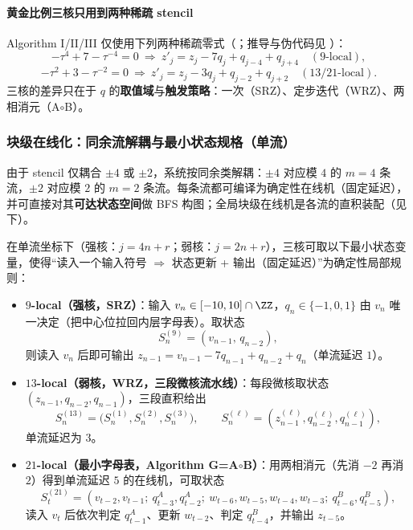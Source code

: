 \paragraph{黄金比例三核只用到两种稀疏 stencil}
Algorithm I/II/III 仅使用下列两种稀疏零式（\cite{SvobodovaAAMPVIIIParallelAddition}；推导与伪代码见 \cite{FrougnyHellerPelantovaSvobodovaParallelAlgorithmsSlides}）：
\[
-\tau^4+7-\tau^{-4}=0\ \Rightarrow\ z'_j=z_j-7q_j+q_{j-4}+q_{j+4}\quad (9\text{-local}),
\]
\[
-\tau^2+3-\tau^{-2}=0\ \Rightarrow\ z'_j=z_j-3q_j+q_{j-2}+q_{j+2}\quad (13/21\text{-local}).
\]
三核的差异只在于 $q$ 的\textbf{取值域}与\textbf{触发策略}：一次（SRZ）、定步迭代（WRZ）、两相消元（A$\circ$B）。

\subsubsection{块级在线化：同余流解耦与最小状态规格（单流）}
由于 stencil 仅耦合 $\pm 4$ 或 $\pm 2$，系统按同余类解耦：$\pm 4$ 对应模 $4$ 的 $m=4$ 条流，$\pm 2$ 对应模 $2$ 的 $m=2$ 条流。每条流都可编译为确定性在线机（固定延迟），并可直接对其\textbf{可达状态空间}做 BFS 构图；全局块级在线机是各流的直积装配（见下）。

\begin{proposition}\label{prop:min-state-spec-flow}
在单流坐标下（强核：$j=4n+r$；弱核：$j=2n+r$），三核可取以下最小状态变量，使得“读入一个输入符号 $\Rightarrow$ 状态更新 + 输出（固定延迟）”为确定性局部规则：
\begin{itemize}
  \item \textbf{$9$-local（强核，SRZ）}：输入 $v_n\in[-10,10]\cap\ZZ$，$q_n\in\{-1,0,1\}$ 由 $v_n$ 唯一决定（把中心位拉回内层字母表）。取状态
  \[
  S^{(9)}_n=(v_{n-1},\,q_{n-2}),
  \]
  则读入 $v_n$ 后即可输出 $z_{n-1}=v_{n-1}-7q_{n-1}+q_{n-2}+q_n$（单流延迟 $1$）。
  \item \textbf{$13$-local（弱核，WRZ，三段微核流水线）}：每段微核取状态
  \(
  (z_{n-1},q_{n-2},q_{n-1})
  \)，三段直积给出
  \[
  S^{(13)}_n=\bigl(S^{(1)}_n,S^{(2)}_n,S^{(3)}_n\bigr),
  \qquad S^{(\ell)}_n=(z^{(\ell)}_{n-1},q^{(\ell)}_{n-2},q^{(\ell)}_{n-1}),
  \]
  单流延迟为 $3$。
  \item \textbf{$21$-local（最小字母表，Algorithm G=A$\circ$B）}：用两相消元（先消 $-2$ 再消 $2$）得到单流延迟 $5$ 的在线机，可取状态
  \[
  S^{(21)}_t=(v_{t-2},v_{t-1};\ q^A_{t-3},q^A_{t-2};\ w_{t-6},w_{t-5},w_{t-4},w_{t-3};\ q^B_{t-6},q^B_{t-5}),
  \]
  读入 $v_t$ 后依次判定 $q^A_{t-1}$、更新 $w_{t-2}$、判定 $q^B_{t-4}$，并输出 $z_{t-5}$。
\end{itemize}
\end{proposition}

